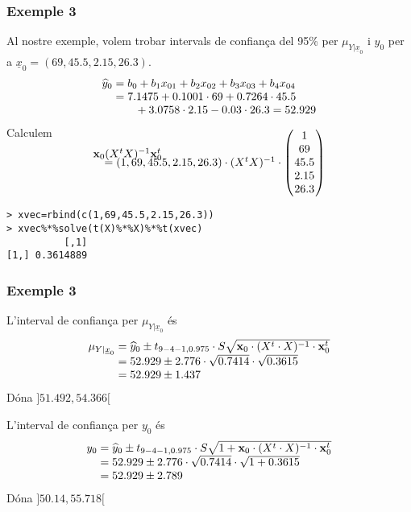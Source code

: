 \documentclass[12pt,t]{beamer}
\theoremstyle{plain}
\theoremstyle{definition}
\begin{document}
\begin{frame}[fragile]
\frametitle{Exemple 3}
Al nostre exemple, volem trobar intervals de confiança del 95\% per $\mu_{Y|\underline{x}_0}$ i ${y}_0$ per a $\underline{x}_0=(69,45.5,2.15,26.3)$.
$$
\begin{array}{l}
\widehat{y}_0=b_0+b_1x_{01}+b_2x_{02}+b_3x_{03}+b_4x_{04}\\
\hphantom{\widehat{y}_0}=7.1475+0.1001\cdot 69 +0.7264\cdot 45.5\\
\hphantom{\widehat{y}_0}\qquad +3.0758\cdot 2.15 -0.03\cdot 26.3= 52.929
\end{array}
$$
Calculem 
$$
\begin{array}{l}
\mathbf{x}_0 (X^t X)^{-1} \mathbf{x}_0^t\\[-1cm]
\quad =(1,69,45.5,2.15,26.3)\cdot (X^t X)^{-1}\cdot \left(\hspace*{-1ex}\begin{array}{c}
1\\ 69 \\ 45.5\\ 2.15 \\ 26.3\end{array}\hspace*{-1ex}
\right)
\end{array}
$$
\begin{verbatim}
> xvec=rbind(c(1,69,45.5,2.15,26.3))
> xvec%*%solve(t(X)%*%X)%*%t(xvec)
          [,1]
[1,] 0.3614889
\end{verbatim}
\end{frame}

\begin{frame}
\frametitle{Exemple 3}
L'interval de confiança per $\mu_{Y|\underline{x}_0}$ és
$$
\begin{array}{l}
\mu_{Y|\underline{x}_0}=\widehat{y}_0\pm t_{9-4-1,0.975}\cdot S\sqrt{\mathbf{x}_0\cdot(X^t  \cdot X)^{-1}\cdot \mathbf{x}_0^t}\\
\hphantom{\mu_{Y|\underline{x}_0}}=52.929\pm 2.776\cdot \sqrt{0.7414}\cdot \sqrt{0.3615}\\
\hphantom{\mu_{Y|\underline{x}_0}}=52.929\pm 1.437
\end{array}
$$
Dóna $]51.492,54.366[$
\medskip\pause

L'interval de confiança per $y_0$ és\pause
$$
\begin{array}{l}
y_0=\widehat{y}_0\pm t_{9-4-1,0.975}\cdot S\sqrt{1+\mathbf{x}_0\cdot(X^t  \cdot X)^{-1}\cdot \mathbf{x}_0^t}\\
\hphantom{y_0}=52.929\pm 2.776\cdot \sqrt{0.7414}\cdot \sqrt{1+0.3615}\\
\hphantom{y_0}=52.929\pm 2.789
\end{array}
$$
Dóna $]50.14, 55.718[$
\end{frame}
\end{document}
